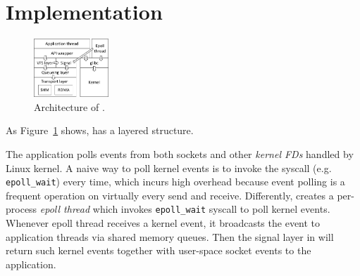 \section{Implementation}
\label{socksdirect:sec:implementation}

\begin{figure}[htbp]
	\centering
	\includegraphics[width=0.25\textwidth]{images/libsd_architecture}
	
	\caption{Architecture of \libipc{}.}
	\label{socksdirect:fig:libsd-architecture}
\end{figure}



As Figure~\ref{socksdirect:fig:libsd-architecture} shows, \libipc{} has a layered structure.








The application polls events from both sockets and other \textit{kernel FDs} handled by Linux kernel.
A naive way to poll kernel events is to invoke the syscall (e.g. \texttt{epoll\_wait}) every time, which incurs high overhead because event polling is a frequent operation on virtually every send and receive.
Differently, \libipc{} creates a per-process \textit{epoll thread} which invokes \texttt{epoll\_wait} syscall to poll kernel events. Whenever epoll thread receives a kernel event, it broadcasts the event to application threads via shared memory queues. Then the signal layer in \libipc{} will return such kernel events together with user-space socket events to the application.


